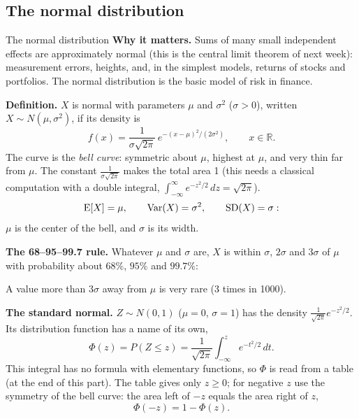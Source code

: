 
\subsection*{The normal distribution}

\begin{key}{The normal distribution}
	\setlength{\parskip}{5pt}
	\textbf{Why it matters.} Sums of many small independent effects are
	approximately normal (this is the central limit theorem of next week):
	measurement errors, heights, and, in the simplest models, returns of
	stocks and portfolios. The normal distribution is the basic model of
	risk in finance.

	\textbf{Definition.} $X$ is normal with parameters $\mu$ and $\sigma^2$
	($\sigma>0$), written $X\sim N(\mu,\sigma^2)$, if its density is
	\[ f(x)=\frac{1}{\sigma\sqrt{2\pi}}\,e^{-(x-\mu)^2/(2\sigma^2)},
		\qquad x\in\mathbb{R}. \]
	The curve is the \emph{bell curve}: symmetric about $\mu$, highest at
	$\mu$, and very thin far from $\mu$. The constant $\frac{1}{\sigma\sqrt{2\pi}}$
	makes the total area 1 (this needs a classical computation with a double
	integral, $\int_{-\infty}^\infty e^{-z^2/2}\,dz=\sqrt{2\pi}$).
	\[ \operatorname{E}[X]=\mu,\qquad\operatorname{Var}(X)=\sigma^2,\qquad\operatorname{SD}(X)=\sigma: \]
	$\mu$ is the center of the bell, and $\sigma$ is its width.

	\noindent\begin{minipage}{\linewidth}
		\textbf{The 68--95--99.7 rule.} Whatever $\mu$ and $\sigma$ are, $X$ is
		within $\sigma$, $2\sigma$ and $3\sigma$ of $\mu$ with probability about
		$68\%$, $95\%$ and $99.7\%$:
		\begin{center}
			\fignormal
		\end{center}
	\end{minipage}
	A value more than $3\sigma$ away from $\mu$ is very rare (3 times in
	1000).

	\textbf{The standard normal.} $Z\sim N(0,1)$ ($\mu=0$, $\sigma=1$) has
	the density $\frac{1}{\sqrt{2\pi}}e^{-z^2/2}$. Its distribution function
	has a name of its own,
	\[ \Phi(z)=P(Z\le z)=\frac{1}{\sqrt{2\pi}}\int_{-\infty}^z e^{-t^2/2}\,dt. \]
	This integral has no formula with elementary functions, so $\Phi$ is read
	from a table (at the end of this part). The table gives only $z\ge0$; for negative $z$
	use the symmetry of the bell curve: the area left of $-z$ equals the area
	right of $z$,
	\[ \Phi(-z)=1-\Phi(z). \]
	\begin{center}
		\figphi
	\end{center}


\end{key}
